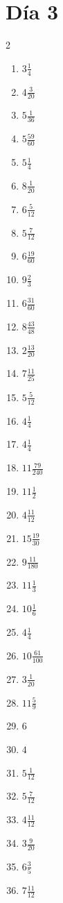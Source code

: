 \documentclass[12pt]{article}
\begin{document}
\section*{Día 3}
\begin{multicols}{2}\begin{enumerate}
\item $ 3 \frac{1}{4} $
\item $ 4 \frac{3}{20} $
\item $ 5 \frac{1}{36} $
\item $ 5 \frac{59}{60} $
\item $ 5 \frac{1}{4} $
\item $ 8 \frac{1}{20} $
\item $ 6 \frac{5}{12} $
\item $ 5 \frac{7}{12} $
\item $ 6 \frac{19}{60} $
\item $ 9 \frac{2}{3} $
\item $ 6 \frac{31}{60} $
\item $ 8 \frac{43}{48} $
\item $ 2 \frac{13}{20} $
\item $ 7 \frac{11}{25} $
\item $ 5 \frac{5}{12} $
\item $ 4 \frac{1}{4} $
\item $ 4 \frac{1}{4} $
\item $ 11 \frac{79}{240} $
\item $ 11 \frac{1}{2} $
\item $ 4 \frac{11}{12} $
\item $ 15 \frac{19}{30} $
\item $ 9 \frac{11}{180} $
\item $ 11 \frac{1}{3} $
\item $ 10 \frac{1}{6} $
\item $ 4 \frac{1}{4} $
\item $ 10 \frac{61}{100} $
\item $ 3 \frac{1}{20} $
\item $ 11 \frac{5}{9} $
\item $ 6 $
\item $ 4 $
\item $ 5 \frac{1}{12} $
\item $ 5 \frac{7}{12} $
\item $ 4 \frac{11}{12} $
\item $ 3 \frac{9}{20} $
\item $ 6 \frac{3}{5} $
\item $ 7 \frac{11}{12} $

\end{enumerate}
\end{multicols}
\end{document}
